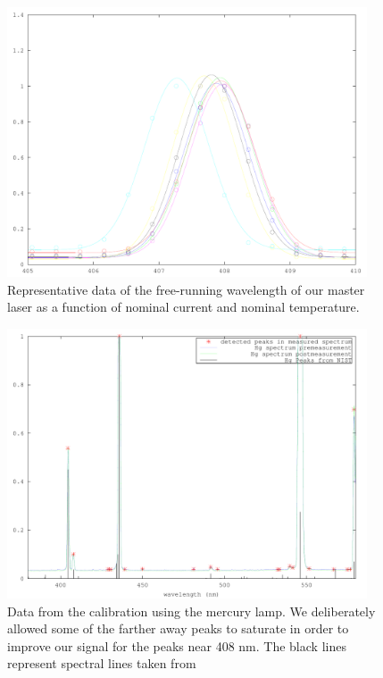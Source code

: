 \begin{figure}
\centering
\includegraphics[width=0.95\textwidth]{wavelength_selected} 
\caption[Graph of Temperatures and Currents]{\label{3dCurrentandTgraph} Representative data of the free-running wavelength of our master laser as a function of nominal current and nominal temperature.}
\end{figure}
\begin{figure}
\centering
\includegraphics[width=0.95\textwidth]{calibrationData} 
\caption[Graph of Temperatures and Currents]{\label{calibrationData} Data from the calibration using the mercury lamp. We deliberately allowed some of the farther away peaks to saturate in order to improve our signal for the peaks near 408 nm. The black lines represent spectral lines taken from \cite{}}
\end{figure}

